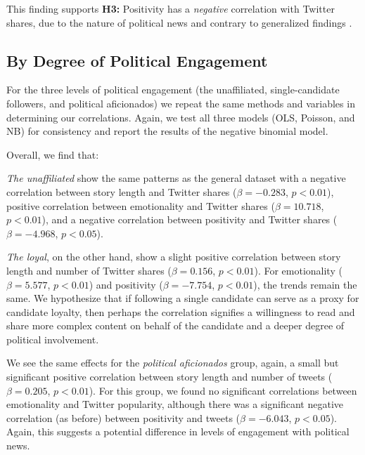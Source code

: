 \documentclass[letterpaper]{article}
\begin{document}


This finding supports \textbf{H3:} Positivity has a \emph{negative} correlation with Twitter shares, due to the nature of political news and contrary to generalized findings \cite{berger2012makes}.

\subsection{By Degree of Political Engagement}

For the three levels of political engagement (the unaffiliated, single-candidate followers, and political aficionados) we repeat the same methods and variables in determining our correlations. Again, we test all three models (OLS, Poisson, and NB) for consistency and report the results of the negative binomial model.
 
 
Overall, we find that: 


\emph{The unaffiliated} show the same patterns as the general dataset with a negative correlation between story length and Twitter shares ($\beta=-0.283$, $p<0.01$), positive correlation between emotionality and Twitter shares ($\beta=10.718$, $p<0.01$), and a negative correlation between positivity and Twitter shares ($\beta=-4.968$, $p<0.05$).

\emph{The loyal}, on the other hand, show a slight positive correlation between story length and number of Twitter shares ($\beta=0.156$, $p<0.01$). For emotionality ($\beta=5.577$, $p<0.01$) and positivity ($\beta=-7.754$, $p<0.01$), the trends remain the same. We hypothesize that if following a single candidate can serve as a proxy for candidate loyalty, then perhaps the correlation signifies a willingness to read and share more complex content on behalf of the candidate and a deeper degree of political involvement.

We see the same effects for the \emph{political aficionados} group, again, a small but significant positive correlation between story length and number of tweets ($\beta=0.205$, $p<0.01$). For this group, we found no significant correlations between emotionality and Twitter popularity, although there was a significant negative correlation (as before) between positivity and tweets ($\beta=-6.043$, $p<0.05$). Again, this suggests a potential difference in levels of engagement with political news.
 
\end{document}
